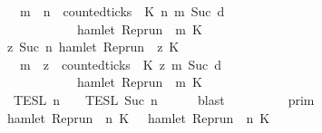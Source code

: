 \begin{isabellebody}
\ \ \ \ \ \ \ \ \ \ \ \ \ \ \ \ \ \ \ \ {\isacharparenleft}{\isasymforall}m\ {\isasymge}\ n{\isachardot}\ \ counted{\isacharunderscore}ticks\ {\isasymrho}\ K\ n\ m\ {\isacharparenleft}Suc\ d{\isacharparenright}\isanewline
\ \ \ \ \ \ \ \ \ \ \ \ \ \ \ \ \ \ \ \ \ \ \ \ \ \ \ \ {\isasymlongrightarrow}\ hamlet\ {\isacharparenleft}{\isacharparenleft}Rep{\isacharunderscore}run\ {\isasymrho}{\isacharparenright}\ m\ K\ {\isacharbraceright}{\isacharparenright}\isanewline
\ \ \ \ \ \ \ \ \ \ \ \ \ \ \ \ {\isasyminter}\ {\isacharbraceleft}{\isasymrho}{\isachardot}\ {\isasymforall}z{\isasymge}\ Suc\ n{\isachardot}\ hamlet\ {\isacharparenleft}{\isacharparenleft}Rep{\isacharunderscore}run\ {\isasymrho}{\isacharparenright}\ z\ K\ {\isasymlongrightarrow}\isanewline
\ \ \ \ \ \ \ \ \ \ \ \ \ \ \ \ \ \ \ \ {\isacharparenleft}{\isasymforall}m\ {\isasymge}\ z{\isachardot}\ \ counted{\isacharunderscore}ticks\ {\isasymrho}\ K\ z\ m\ {\isacharparenleft}Suc\ d{\isacharparenright}\isanewline
\ \ \ \ \ \ \ \ \ \ \ \ \ \ \ \ \ \ \ \ \ \ \ \ \ \ \ \ {\isasymlongrightarrow}\ hamlet\ {\isacharparenleft}{\isacharparenleft}Rep{\isacharunderscore}run\ {\isasymrho}{\isacharparenright}\ m\ K\ {\isacharbraceright}\isanewline
\ \ \ \ \ \ \ \ \ \ \ \ \ \ \ \ {\isasyminter}\ {\isasymlbrakk}{\isasymlbrakk}\ {\isasymPsi}\ {\isasymrbrakk}{\isasymrbrakk}\isactrlsub T\isactrlsub E\isactrlsub S\isactrlsub L\isactrlbsup {\isasymge}\ n\isactrlesup \ {\isasyminter}\ {\isasymlbrakk}{\isasymlbrakk}\ {\isasymPhi}\ {\isasymrbrakk}{\isasymrbrakk}\isactrlsub T\isactrlsub E\isactrlsub S\isactrlsub L\isactrlbsup {\isasymge}\ Suc\ n\isactrlesup {\isacartoucheclose}\isanewline
\ \ \ \ \isamarkupfalse%
\ blast\isanewline
\ \ \isamarkupfalse%
\ \isamarkupfalse%
\ {\isacartoucheopen}{\isachardot}{\isachardot}{\isachardot}\ {\isacharequal}\ {\isasymlbrakk}{\isasymlbrakk}\ {\isasymGamma}\ {\isasymrbrakk}{\isasymrbrakk}\isactrlsub p\isactrlsub r\isactrlsub i\isactrlsub m\ \isanewline
\ \ \ \ \ \ \ \ \ \ \ \ \ \ \ \ {\isasyminter}\ {\isacharparenleft}{\isacharbraceleft}{\isasymrho}{\isachardot}\ {\isasymnot}hamlet\ {\isacharparenleft}{\isacharparenleft}Rep{\isacharunderscore}run\ {\isasymrho}{\isacharparenright}\ n\ K\ {\isasymunion}\ {\isacharbraceleft}{\isasymrho}{\isachardot}\ hamlet\ {\isacharparenleft}{\isacharparenleft}Rep{\isacharunderscore}run\ {\isasymrho}{\isacharparenright}\ n\ K\ {\isasymand}\isanewline

\end{isabellebody}
